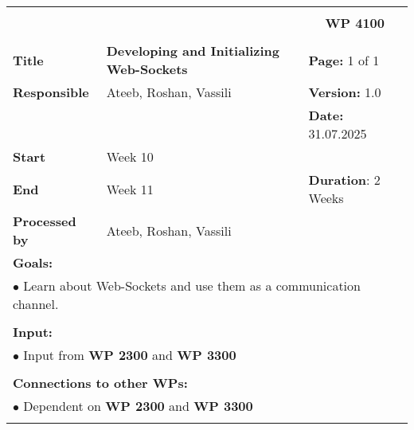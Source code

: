 \begin{table}[!h]
    \begin{center}
        \begin{tabular}{|p{}||p{}|p{}||p{}|}
            \hline
            \multicolumn{3}{|l||}{\textbf{}} & \multicolumn{1}{c|}{}\\
            \multicolumn{3}{|l||}{\textbf{}} & \multicolumn{1}{c|}{\textbf{WP 4100}}\\
            \multicolumn{3}{|l||}{\textbf{}} & \multicolumn{1}{c|}{}\\
            \hline\hline
            \textbf{Title} & \multicolumn{2}{p{.40\columnwidth}||}{\textbf{Developing and Initializing Web-Sockets}}
            & \textbf{Page:} 1 of 1\\
            \hline
            \textbf{Responsible} & \multicolumn{2}{l||}{Ateeb, Roshan, Vassili} & \textbf{Version:} 1.0\\
            \hline
            \multicolumn{3}{|l||}{} & \textbf{Date:} 31.07.2025\\
            \hline\hline
            \textbf{Start} & \multicolumn{2}{l||}{Week 10} & \\
            \hline
            \textbf{End} & \multicolumn{2}{l||}{Week 11} & \textbf{Duration}: 2 Weeks\\
            \hline\hline
            \textbf{Processed by} & \multicolumn{3}{l|}{Ateeb, Roshan, Vassili}\\
            \hline\hline
            \multicolumn{4}{|p{.95\columnwidth}|}{\textbf{Goals:}}\\
            \multicolumn{4}{|p{.95\columnwidth}|}{$\bullet$ Learn about Web-Sockets and use them as a communication channel.}\\
            \multicolumn{4}{|p{.95\columnwidth}|}{}\\
            \multicolumn{4}{|p{.95\columnwidth}|}{\textbf{Input:}}\\
            \multicolumn{4}{|p{.95\columnwidth}|}{$\bullet$ Input from \textbf{WP 2300} and \textbf{WP 3300}}\\
            \multicolumn{4}{|p{.95\columnwidth}|}{}\\
            \multicolumn{4}{|p{.95\columnwidth}|}{\textbf{Connections to other WPs:}}\\
            \multicolumn{4}{|p{.95\columnwidth}|}{$\bullet$ Dependent on \textbf{WP 2300} and \textbf{WP 3300}}\\
            \multicolumn{4}{|p{.95\columnwidth}|}{}\\

\end{tabular}
\end{center}
\end{table}
